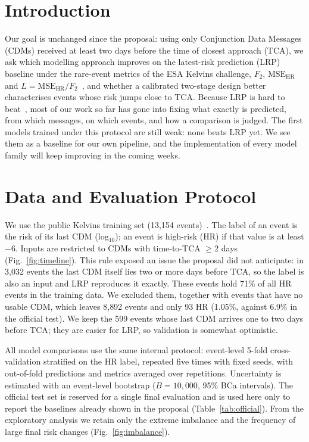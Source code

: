 \documentclass[clean]{bam-proposal}
\begin{document}
\makeproposalheader

\section{Introduction}

Our goal is unchanged since the proposal: using only Conjunction Data Messages (CDMs) received at least two days before the time of closest approach (TCA), we ask which modelling approach improves on the latest-risk prediction (LRP) baseline under the rare-event metrics of the ESA Kelvins challenge, \(F_2\), \(\mathrm{MSE}_{\mathrm{HR}}\) and \(L=\mathrm{MSE}_{\mathrm{HR}}/F_2\)~\citep{uriot2021collision}, and whether a calibrated two-stage design better characterises events whose risk jumps close to TCA. Because LRP is hard to beat~\citep{uriot2021collision}, most of our work so far has gone into fixing what exactly is predicted, from which messages, on which events, and how a comparison is judged. The first models trained under this protocol are still weak: none beats LRP yet. We see them as a baseline for our own pipeline, and the implementation of every model family will keep improving in the coming weeks.

\section{Data and Evaluation Protocol}

We use the public Kelvins training set (13{,}154 events)~\citep{zenodo4463683}. The label of an event is the risk of its last CDM (log\(_{10}\)); an event is high-risk (HR) if that value is at least \(-6\). Inputs are restricted to CDMs with time-to-TCA \(\ge 2\) days (Fig.~\ref{fig:timeline}). This rule exposed an issue the proposal did not anticipate: in 3{,}032 events the last CDM itself lies two or more days before TCA, so the label is also an input and LRP reproduces it exactly. These events hold 71\% of all HR events in the training data. We excluded them, together with events that have no usable CDM, which leaves 8{,}892 events and only 93 HR (1.05\%, against 6.9\% in the official test). We keep the 599 events whose last CDM arrives one to two days before TCA; they are easier for LRP, so validation is somewhat optimistic.

All model comparisons use the same internal protocol: event-level 5-fold cross-validation stratified on the HR label, repeated five times with fixed seeds, with out-of-fold predictions and metrics averaged over repetitions. Uncertainty is estimated with an event-level bootstrap (\(B=10{,}000\), 95\% BCa intervals). The official test set is reserved for a single final evaluation and is used here only to report the baselines already shown in the proposal (Table~\ref{tab:official}). From the exploratory analysis we retain only the extreme imbalance and the frequency of large final risk changes (Fig.~\ref{fig:imbalance}).
\end{document}
